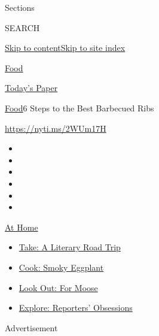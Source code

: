 Sections

SEARCH

\protect\hyperlink{site-content}{Skip to
content}\protect\hyperlink{site-index}{Skip to site index}

\href{https://www.nytimes.com/section/food}{Food}

\href{https://myaccount.nytimes.com/auth/login?response_type=cookie\&client_id=vi}{}

\href{https://www.nytimes.com/section/todayspaper}{Today's Paper}

\href{/section/food}{Food}\textbar{}6 Steps to the Best Barbecued Ribs

\url{https://nyti.ms/2WUm17H}

\begin{itemize}
\item
\item
\item
\item
\item
\item
\end{itemize}

\href{https://www.nytimes.com/spotlight/at-home?action=click\&pgtype=Article\&state=default\&region=TOP_BANNER\&context=at_home_menu}{At
Home}

\begin{itemize}
\tightlist
\item
  \href{https://www.nytimes.com/2020/07/28/books/time-for-a-literary-road-trip.html?action=click\&pgtype=Article\&state=default\&region=TOP_BANNER\&context=at_home_menu}{Take:
  A Literary Road Trip}
\item
  \href{https://www.nytimes.com/2020/07/29/magazine/bored-with-your-home-cooking-some-smoky-eggplant-will-fix-that.html?action=click\&pgtype=Article\&state=default\&region=TOP_BANNER\&context=at_home_menu}{Cook:
  Smoky Eggplant}
\item
  \href{https://www.nytimes.com/2020/07/27/travel/moose-michigan-isle-royale.html?action=click\&pgtype=Article\&state=default\&region=TOP_BANNER\&context=at_home_menu}{Look
  Out: For Moose}
\item
  \href{https://www.nytimes.com/interactive/2020/at-home/even-more-reporters-editors-diaries-lists-recommendations.html?action=click\&pgtype=Article\&state=default\&region=TOP_BANNER\&context=at_home_menu}{Explore:
  Reporters' Obsessions}
\end{itemize}

Advertisement

